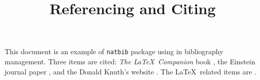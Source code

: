 \documentclass{article}
\title{\textbf{Referencing and Citing}}
\date{}
\begin{document}
\maketitle

This document is an example of \texttt{natbib} package using in bibliography 
management. Three items are cited: \textit{The \LaTeX\ Companion} book \cite{latexcompanion}, the Einstein journal paper \citet{einstein}, and the 
Donald Knuth's website \cite{knuthwebsite}. The \LaTeX\ related items are
\cite{latexcompanion,knuthwebsite}. 

\medskip  %


\begin{comment}
\texttt{} is used for monospace type font.
\textit{} for italic font
\cite{} is generak citing, but
\citet{} when the author's name(s) are part of the sentence you're writing., so it also mention author name with citing.
\end{comment}
\end{document}
